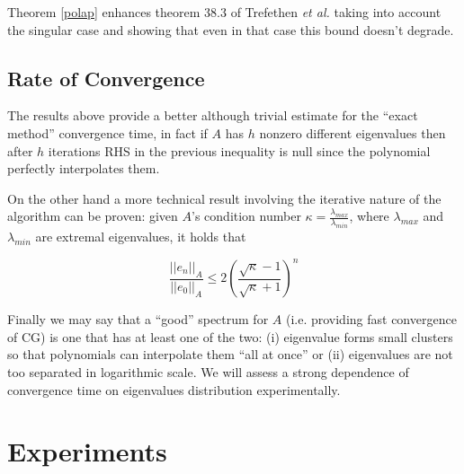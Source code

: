 \documentclass[12pt]{article}
\newcommand{\1}{\mathbbm{1}}
\begin{document}
 Theorem \ref{polap} enhances theorem 38.3 of Trefethen {\em et al.} \cite{trefethen97} taking into account the singular case and showing that even in that case this bound doesn't degrade.

\subsection{Rate of Convergence}
The results above provide a better although trivial estimate for the ``exact method'' convergence time, in fact if $A$ has $h$ nonzero different eigenvalues then after $h$ iterations RHS in the previous inequality is null since the polynomial perfectly interpolates them.

On the other hand a more technical result involving the iterative nature of the algorithm can be proven: given $A$'s condition number $\kappa = \frac{\lambda_{max}}{\lambda_{min}}$, where $\lambda_{max}$ and $\lambda_{min}$ are extremal eigenvalues, it holds that

$$ \frac{||e_n||_A}{||e_0||_A} \leq 2 \left(\frac{\sqrt{\kappa} - 1}{\sqrt{\kappa} + 1}\right)^n $$

Finally we may say that a ``good'' spectrum for $A$ (i.e. providing fast convergence of CG) is one that has at least one of the two: (i) eigenvalue forms small clusters so that polynomials can interpolate them ``all at once'' or (ii) eigenvalues are not too separated in logarithmic scale. We will assess a strong dependence of convergence time on eigenvalues distribution experimentally. 


\section{Experiments}
\end{document}
